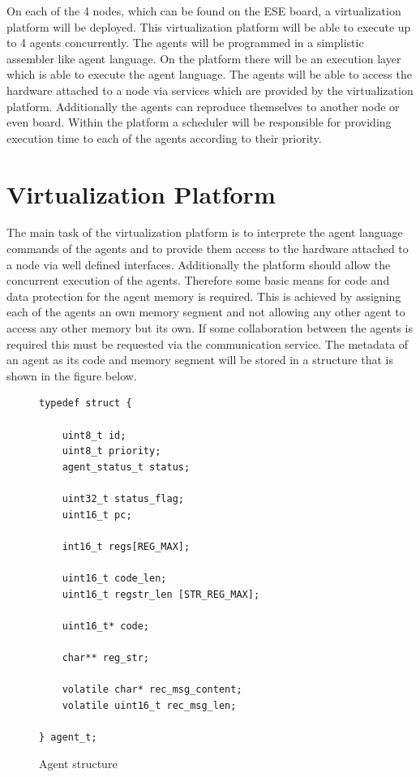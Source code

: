 \documentclass{scrreprt}
\begin{document}
On each of the 4 nodes, which can be found on the ESE board, a virtualization platform will be deployed. 
This virtualization platform will be able to execute up to 4 agents concurrently. The agents will be 
programmed in a simplistic assembler like agent language. On the platform there will be an execution 
layer which is able to execute the agent language. The agents will be able to access the hardware attached
to a node via services which are provided by the virtualization platform. Additionally the agents can
reproduce themselves to another node or even board. Within the platform a scheduler will be responsible for
providing execution time to each of the agents according to their priority. 

\section{Virtualization Platform}
The main task of the virtualization platform is to interprete the agent language commands of the agents 
and to provide them access to the hardware attached to a node via well defined interfaces. Additionally 
the platform should allow the concurrent execution of the agents. Therefore some basic means for code and 
data protection for the agent memory is required. This is achieved by assigning each of the agents an own 
memory segment and not allowing any other agent to access any other memory but its own. If some collaboration 
between the agents is required this must be requested via the communication service. The metadata of an agent 
as its code and memory segment will be stored in a structure that is shown in the figure below. 


\begin{figure}[!htb]
\lstset{language=C}
\begin{lstlisting}[frame=single]
typedef struct {

	uint8_t id;	
	uint8_t priority;
	agent_status_t status;

	uint32_t status_flag;
	uint16_t pc;

	int16_t regs[REG_MAX];

	uint16_t code_len;
	uint16_t regstr_len [STR_REG_MAX];

	uint16_t* code;

	char** reg_str;

	volatile char* rec_msg_content;
	volatile uint16_t rec_msg_len;
	
} agent_t;
\end{lstlisting}
\caption{Agent structure}
\label{agent}
\end{figure}
\end{document}
